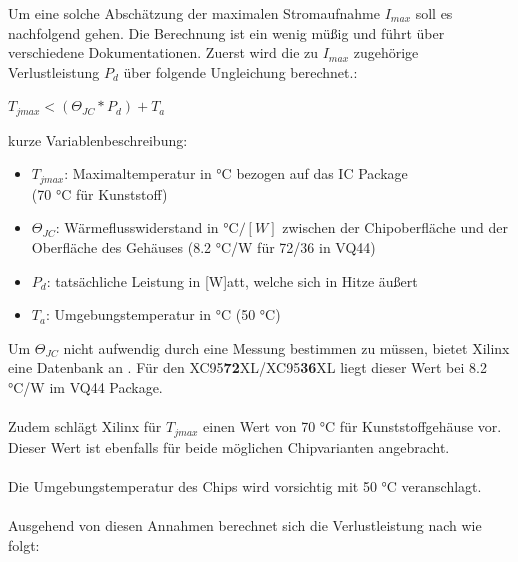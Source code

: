 \documentclass{article}
\begin{document}
Um eine solche Abschätzung der maximalen Stromaufnahme $I_{max}$ soll es nachfolgend gehen. Die Berechnung ist ein wenig müßig und führt über verschiedene Dokumentationen.
Zuerst wird die zu $I_{max}$ zugehörige Verlustleistung $P_d$ über folgende Ungleichung berechnet.\autocite[16]{XC95_maxI}: 
\begin{center}
	$T_{jmax} < (\Theta_{JC}*P_d)+T_a$
\end{center}

\newpage

kurze Variablenbeschreibung:

\begin{itemize}
	\item $T_{jmax}$: Maximaltemperatur in \si{\celsius} bezogen auf das IC Package \\(70 \si{\celsius} für Kunststoff) \autocite[54]{Device_pkg}
	\item $\Theta_{JC}$: Wärmeflusswiderstand in $\si{\celsius}/[W]$ zwischen der Chipoberfläche und der Oberfläche des Gehäuses \autocite[53]{Device_pkg} (8.2 \si{\celsius}/W für 72/36 in VQ44)
	\item $P_d$: tatsächliche Leistung in [W]att, welche sich in Hitze äußert \autocite[16]{XC95_maxI}
	\item $T_a$: Umgebungstemperatur in \si{\celsius} (50 \si{\celsius})
\end{itemize}

Um $\Theta_{JC}$ nicht aufwendig durch eine Messung bestimmen zu müssen, bietet Xilinx eine Datenbank an \autocite{ThetaJC}. Für den XC95\textbf{72}XL/XC95\textbf{36}XL liegt dieser Wert bei 8.2 \si{\celsius}/W im VQ44 Package.\\\\
Zudem schlägt Xilinx für $T_{jmax}$ einen Wert von 70 \si{\celsius} für Kunststoffgehäuse vor. Dieser Wert ist ebenfalls für beide möglichen Chipvarianten angebracht.\\\\
Die Umgebungstemperatur des Chips wird vorsichtig mit 50 \si{\celsius} veranschlagt.\\\\
Ausgehend von diesen Annahmen berechnet sich die Verlustleistung nach \autocite[16]{XC95_maxI} wie folgt:
\end{document}
